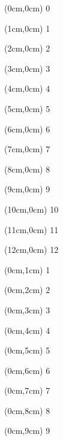 \begin{frame}
	

	\begin{textblock*}{0cm}(0cm,0cm)
		0
	\end{textblock*}

	\begin{textblock*}{0cm}(1cm,0cm)
		1
	\end{textblock*}
	\begin{textblock*}{0cm}(2cm,0cm)
		2
	\end{textblock*}
	\begin{textblock*}{0cm}(3cm,0cm)
		3
	\end{textblock*}
	\begin{textblock*}{0cm}(4cm,0cm)
		4
	\end{textblock*}
	\begin{textblock*}{0cm}(5cm,0cm)
		5
	\end{textblock*}
	\begin{textblock*}{0cm}(6cm,0cm)
		6
	\end{textblock*}
	\begin{textblock*}{0cm}(7cm,0cm)
		7
	\end{textblock*}
	\begin{textblock*}{0cm}(8cm,0cm)
		8
	\end{textblock*}
	\begin{textblock*}{0cm}(9cm,0cm)
		9
	\end{textblock*}
	\begin{textblock*}{0cm}(10cm,0cm)
		10
	\end{textblock*}
	\begin{textblock*}{0cm}(11cm,0cm)
		11
	\end{textblock*}
	\begin{textblock*}{0cm}(12cm,0cm)
		12
	\end{textblock*}

	\begin{textblock*}{0cm}(0cm,1cm)
		1
	\end{textblock*}
	\begin{textblock*}{0cm}(0cm,2cm)
		2
	\end{textblock*}
	\begin{textblock*}{0cm}(0cm,3cm)
		3
	\end{textblock*}
	\begin{textblock*}{0cm}(0cm,4cm)
		4
	\end{textblock*}
	\begin{textblock*}{0cm}(0cm,5cm)
		5
	\end{textblock*}
	\begin{textblock*}{0cm}(0cm,6cm)
		6
	\end{textblock*}
	\begin{textblock*}{0cm}(0cm,7cm)
		7
	\end{textblock*}
	\begin{textblock*}{0cm}(0cm,8cm)
		8
	\end{textblock*}
	\begin{textblock*}{0cm}(0cm,9cm)
		9
	\end{textblock*}


\end{frame}
